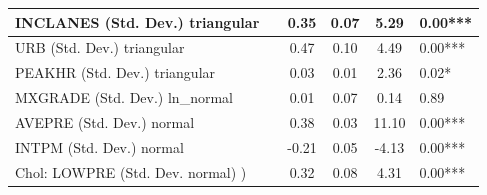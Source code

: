 \begin{table}
\begin{center}
\begin{tabular}{|l|l|c|c|c|l|}
			\hline
			INCLANES (Std. Dev.) triangular &  & 0.35 & 0.07 & 5.29 & 0.00*** \\
			\hline
			URB (Std. Dev.) triangular &  & 0.47 & 0.10 & 4.49 & 0.00*** \\
			\hline
			PEAKHR (Std. Dev.) triangular &  & 0.03 & 0.01 & 2.36 & 0.02* \\
			\hline
			MXGRADE (Std. Dev.) ln_normal &  & 0.01 & 0.07 & 0.14 & 0.89 \\
			\hline
			AVEPRE (Std. Dev.) normal &  & 0.38 & 0.03 & 11.10 & 0.00*** \\
			\hline
			INTPM (Std. Dev.) normal &  & -0.21 & 0.05 & -4.13 & 0.00*** \\
			\hline
			 Chol: LOWPRE (Std. Dev. normal) ) &  & 0.32 & 0.08 & 4.31 & 0.00*** \\
			\hline
		\end{tabular}
	\end{center}
\end{table}